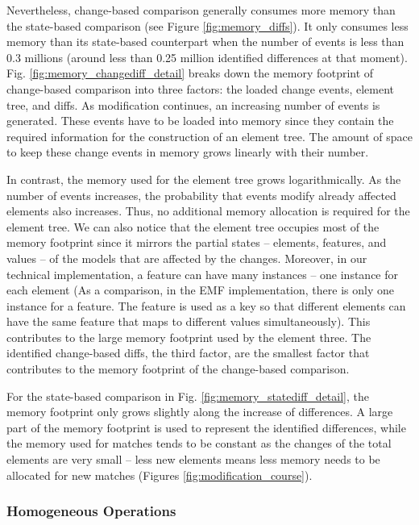 Nevertheless, change-based comparison generally consumes more memory than the state-based comparison (see Figure \ref{fig:memory_diffs}). It only consumes less memory than its state-based counterpart when the number of events is less than 0.3 millions (around less than 0.25 million identified differences at that moment). Fig. \ref{fig:memory_changediff_detail} breaks down the memory footprint of change-based comparison into three factors: the loaded change events, element tree, and diffs. As modification continues, an increasing number of events is generated. These events have to be loaded into memory since they contain the required information for the construction of an element tree. The amount of space to keep these change events in memory grows linearly with their number. 

In contrast, the memory used for the element tree grows logarithmically. As the number of events increases, the probability that events modify already affected elements also increases. Thus, no additional memory allocation is required for the element tree. We can also notice that the element tree occupies most of the memory footprint since it mirrors the partial states -- elements, features, and values -- of the models that are affected by the changes. Moreover, in our technical implementation, a feature can have many instances -- one instance for each element (As a comparison, in the EMF implementation, there is only one instance for a feature. The feature is used as a key so that different elements can have the same feature that maps to different values simultaneously). This contributes to the large memory footprint used by the element three. The identified change-based diffs, the third factor, are the smallest factor that contributes to the memory footprint of the change-based comparison. 

For the state-based comparison in Fig. \ref{fig:memory_statediff_detail}, the memory footprint only grows slightly along the increase of differences. A large part of the memory footprint is used to represent the identified differences, while the memory used for matches tends to be constant as the changes of the total elements are very small -- less new elements means less memory needs to be allocated for new matches (Figures \ref{fig:modification_course}). 

\subsubsection{Homogeneous Operations}
\label{sec:homogeneous-operation}

